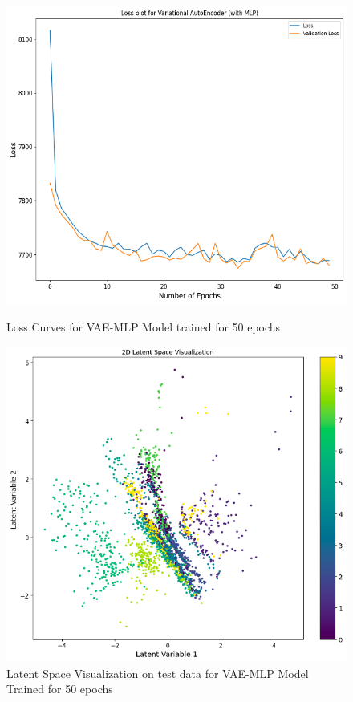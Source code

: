 \documentclass[12pt]{article}
\begin{document}
\begin{figure}[htbp]
    \centering
    \begin{minipage}[b]{0.45\linewidth}
        \centering
        \includegraphics[width=\linewidth]{mlp_vae_50.png}
        \caption{Loss Curves for VAE-MLP Model trained for 50 epochs}
        \label{fig:gen_stft}
    \end{minipage}
    \hfill
    \begin{minipage}[b]{0.45\linewidth}
        \centering
        \includegraphics[width=\linewidth]{mlp_vae_lat.png}
        \caption{Latent Space Visualization on test data for VAE-MLP Model Trained for 50 epochs}
        \label{fig:generated_audio}
    \end{minipage}
\end{figure}
\end{document}
